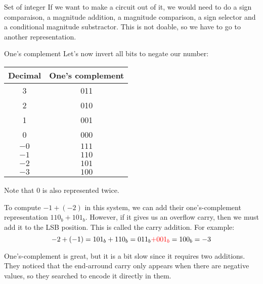 \documentclass[a4paper]{article}
\begin{document}
\begin{parag}{Set of integer}
    If we want to make a circuit out of it, we would need to do a sign comparaison, a magnitude addition, a magnitude comparison, a sign selector and a conditional magnitude substractor. This is not doable, so we have to go to another representation.
\end{parag}

\begin{parag}{One's complement}
    Let's now invert all bits to negate our number: 
    \begin{center}
    \begin{tabular}{c|c}
        Decimal & One's complement  \\
        \hline
        3 & 011 \\
        2 & 010 \\
        1 & 001 \\
        0 & 000 \\
        $-0$ & $111$ \\
        $-1$ & $110$ \\
        $-2$ & $101$ \\
        $-3$ & $100$
    \end{tabular}
    \end{center}
    

    Note that 0 is also represented twice.

    To compute $-1 + \left(-2\right)$ in this system, we can add their one's-complement representation $110_b + 101_b$. However, if it gives us an overflow carry, then we must add it to the LSB position. This is called the  carry addition. For example: 
    \[-2 + \left(-1\right) = 101_b + 110_b = 011_b {\color{red}+ 001_b} = 100_b = -3\]

    One's-complement is great, but it is a bit slow since it requires two additions. They noticed that the end-arround carry only appears when there are negative values, so they searched to encode it directly in them.
\end{parag}
\end{document}
